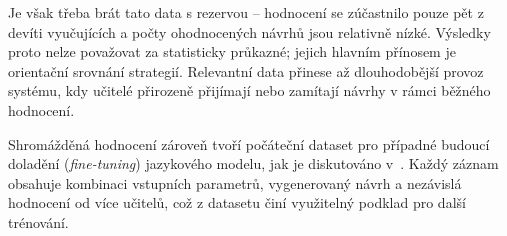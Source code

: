 Je však třeba brát tato data s rezervou -- hodnocení se zúčastnilo pouze pět z devíti vyučujících a počty ohodnocených návrhů jsou relativně nízké.
Výsledky proto nelze považovat za statisticky průkazné; jejich hlavním přínosem je orientační srovnání strategií.
Relevantní data přinese až dlouhodobější provoz systému, kdy učitelé přirozeně přijímají nebo zamítají návrhy v rámci běžného hodnocení.

Shromážděná hodnocení zároveň tvoří počáteční dataset pro případné budoucí doladění (\textit{fine-tuning}) jazykového modelu, jak je diskutováno v~.
Každý záznam obsahuje kombinaci vstupních parametrů, vygenerovaný návrh a nezávislá hodnocení od více učitelů, což z datasetu činí využitelný podklad pro další trénování.

\endinput